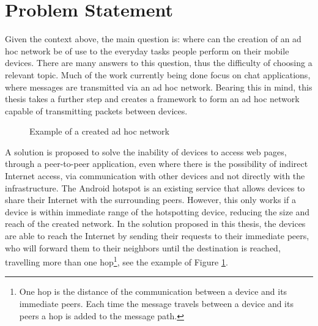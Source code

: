 \section{Problem Statement}

Given the context above, the main question is: where can the creation of an ad hoc network be of use to the everyday tasks people perform on their mobile devices. There are many answers to this question, thus the difficulty of choosing a relevant topic. Much of the work currently being done focus on chat applications, where messages are transmitted via an ad hoc network. Bearing this in mind, this thesis takes a further step and creates a framework to form an ad hoc network capable of transmitting packets between devices.

\begin{figure}[ht]
	\noindent{}
	\caption{\label{fig:context} Example of a created ad hoc network}
\end{figure}

A solution is proposed to solve the inability of devices to access web pages, through a peer-to-peer application, even where there is the possibility of indirect Internet access, via communication with other devices and not directly with the infrastructure. The Android hotspot is an existing service that allows devices to share their Internet with the surrounding peers. However, this only works if a device is within immediate range of the hotspotting device, reducing the size and reach of the created network. In the solution proposed in this thesis, the devices are able to reach the Internet by sending their requests to their immediate peers, who will forward them to their neighbors until the destination is reached, travelling more than one hop\footnote{One hop is the distance of the communication between a device and its immediate peers. Each time the message travels between a device and its peers a hop is added to the message path.}, see the example of Figure \ref{fig:context}.


